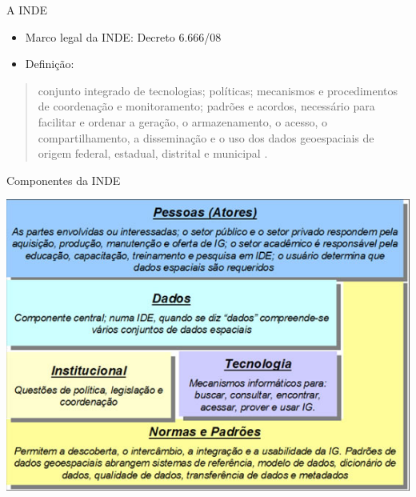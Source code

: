 \documentclass[9pt,ignorenonframetext,]{beamer}
\begin{document}
\begin{frame}{A INDE}
\protect\hypertarget{a-inde}{}

\begin{itemize}
\item
  Marco legal da INDE: Decreto 6.666/08
\item
  Definição:
\end{itemize}

\begin{quote}
conjunto integrado de tecnologias; políticas; mecanismos e procedimentos
de coordenação e monitoramento; padrões e acordos, necessário para
facilitar e ordenar a geração, o armazenamento, o acesso, o
compartilhamento, a disseminação e o uso dos dados geoespaciais de
origem federal, estadual, distrital e municipal \autocite{INDE}.
\end{quote}

\end{frame}

\begin{frame}{Componentes da INDE}
\protect\hypertarget{componentes-da-inde}{}

\begin{center}\includegraphics[width=0.7\linewidth]{Compenentes_INDE_2} \end{center}

\end{frame}
\end{document}
